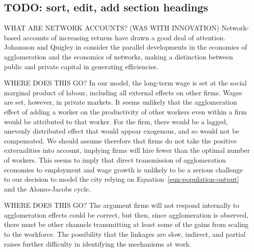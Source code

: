\documentclass[a4paper]{article}
\theoremstyle{definition}
\theoremstyle{plain}
\begin{document}
{\subsection{TODO: sort, edit, add section headings} %



WHAT ARE NETWORK ACCOUNTS? (WAS WITH INNOVATION) Network-based accounts of increasing returns have drawn a good deal of attention.
Johansson and Quigley \cite{johanssonAgglomerationNetworksSpatial} in \cite{floraxFiftyYearsRegional2004} consider the parallel developments in the economics of agglomeration and the economics of networks, making a distinction between public and private capital in generating efficiencies.

WHERE DOES THIS GO? In our model, the long-term wage is set at the social marginal product of labour, including all external effects on other firms. Wages are set, however, in private markets. It seems unlikely that the agglomeration effect of adding a worker on the productivity of other workers even within a firm would be attributed to that worker. For the firm, there would be a lagged, unevenly distributed effect that would appear exogenous, and so would not be compensated. 
We should assume therefore that firms do not take the positive externalities into account, implying firms will hire fewer than the optimal number of workers. 
This seems to imply that direct transmission of agglomeration economies to employment and wage growth is unlikely to be a serious challenge to our decision to model the city relying on Equation~\ref{eqn-population-output} and the  Alonso-Jacobs cycle.




WHERE DOES THIS GO? The argument firms will not respond internally to agglomeration effects could be correct, but then, since agglomeration is observed, there must be other channels transmitting at least some of the gains from scaling to the workforce. 
The possibility that the linkages are slow, indirect, and partial raises further difficulty in identifying the mechanisms at work.




}
\end{document}
